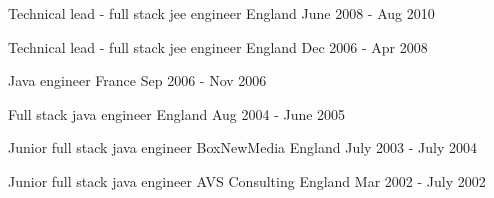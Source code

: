 

\begin{cventries}

  \cventry
    {Technical lead - full stack jee engineer} %
    {} %
    {England} %
    {June 2008 - Aug 2010} %
    {} %
    {}

  \cventry
    {Technical lead - full stack jee engineer} %
    {} %
    {England} %
    {Dec 2006 - Apr 2008} %
    {} %
    {}

  \cventry
    {Java engineer} %
    {} %
    {France} %
    {Sep 2006 - Nov 2006} %
    {} %
    {}

  \cventry
    {Full stack java engineer} %
    {} %
    {England} %
    {Aug 2004 - June 2005} %
    {} %
    {}

  \cventry
    {Junior full stack java engineer} %
    {BoxNewMedia} %
    {England} %
    {July 2003 - July 2004} %
    {} %
    {}

  \cventry
    {Junior full stack java engineer} %
    {AVS Consulting} %
    {England} %
    {Mar 2002 - July 2002} %
    {} %
    {}

\end{cventries}
